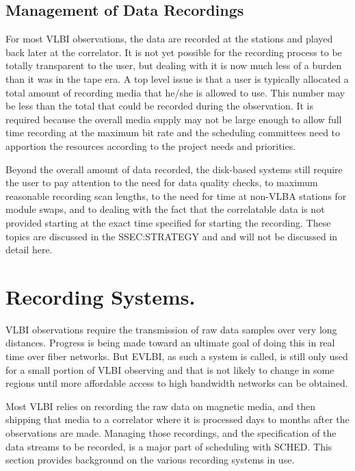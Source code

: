 \documentclass{report}
\newcommand{\sched}{{\sc SCHED}}
\begin{document}
\subsection{\label{SSEC:RECMANAGEMENT}Management of Data Recordings}

For most VLBI observations, the data are recorded at the stations and
played back later at the correlator.  It is not yet possible for the
recording process to be totally transparent to the user, but dealing
with it is now much less of a burden than it was in the tape era.
A top level issue is that a user is typically allocated a total amount
of recording media that he/she is allowed to use.  This number may
be less than the total that could be recorded during the observation.
It is required because the overall media supply may not be large
enough to allow full time recording at the maximum bit rate and the
scheduling committees need to apportion the resources according to
the project needs and priorities.

Beyond the overall amount of data recorded, the disk-based systems
still require the user to pay attention to the need for data quality
checks, to maximum reasonable recording scan lengths, to the need for
time at non-VLBA stations for module swaps, and to dealing with the
fact that the correlatable data is not provided starting at the exact
time specified for starting the recording.  These topics are discussed
in the  {SSEC:STRATEGY} and  and will not be discussed in detail
here.

\section{\label{SEC:RECSYS}Recording Systems.}

VLBI observations require the transmission of raw data samples over 
very long distances.  Progress is being made toward an ultimate
goal of doing this in real time over fiber networks.  But EVLBI, as
such a system is called, is still only used for a small portion 
of VLBI observing and that is not likely to change in some regions
until more affordable access to high bandwidth networks can be obtained.

Most VLBI relies on recording the raw data on magnetic media, and then
shipping that media to a correlator where it is processed days to months
after the observations are made.  Managing those recordings, and the 
specification of the data streams to be recorded, is a major part of 
scheduling with \sched.  This section provides background on the
various recording systems in use.
\end{document}
